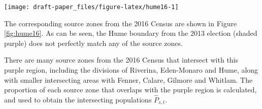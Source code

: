 \documentclass[11pt,a4paper,]{article}
\let\origfigure\figure
\let\endorigfigure\endfigure
\renewenvironment{figure}[1][2] {
    \expandafter\origfigure\expandafter[htbp]
} {
    \endorigfigure
}
\let\origtable\table
\let\endorigtable\endtable
\renewenvironment{table}[1][2] {
    \expandafter\origtable\expandafter[htbp]
} {
    \endorigtable
}
\begin{document}
\begin{figure}[h]

{\centering \texttt{[image: draft-paper\_files/figure-latex/hume16-1]} 

}

\caption{Census division boundaries in NSW for 2016, with the 2013 electoral boundary for Hume, shown in purple. The purple region is not contained within a single Census division.}\label{fig:hume16}
\end{figure}

The corresponding source zones from the 2016 Census are shown in Figure \ref{fig:hume16}. As can be seen, the Hume boundary from the 2013 election (shaded purple) does not perfectly match any of the source zones.

There are many source zones from the 2016 Census that intersect with this purple region, including the divisions of Riverina, Eden-Monaro and Hume, along with smaller intersecting areas with Fenner, Calare, Gilmore and Whitlam. The proportion of each source zone that overlaps with the purple region is calculated, and used to obtain the intersecting populations \(\hat{P}_{s,t}\).

\begin{table}[t]

\caption{\label{tab:hume1}Population from each intersecting Census source zone (2016) that is allocated to the target zone (purple region - Hume electoral boundary in 2013), and the corresponding proportion of Australian citizens in each of these source zones.}
\centering
{}
\end{table}
\end{document}
